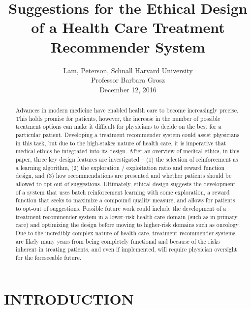 \documentclass[]{spie}  %
\title{Suggestions for the Ethical Design of a Health Care Treatment Recommender System}
\author{Lam, Peterson, Schnall
\skiplinehalf
Harvard University \\
Professor Barbara Grosz \\
December 12, 2016
}
\begin{document}
  \maketitle

\begin{abstract}

Advances in modern medicine have enabled health care to become increasingly precise. This holds promise for patients, however, the increase in the number of possible treatment options can make it difficult for physicians to decide on the best for a particular patient. Developing a treatment recommender system could assist physicians in this task, but due to the high-stakes nature of health care, it is imperative that medical ethics be integrated into its design. After an overview of medical ethics, in this paper, three key design features are investigated -- (1) the selection of reinforcement as a learning algorithm, (2) the exploration / exploitation ratio and reward function design, and (3) how recommendations are presented and whether patients should be allowed to opt out of suggestions. Ultimately, ethical design suggests the development of a system that uses batch reinforcement learning with some exploration, a reward function that seeks to maximize a compound quality measure, and allows for patients to opt-out of suggestions. Possible future work could include the development of a treatment recommender system in a lower-risk health care domain (such as in primary care) and optimizing the design before moving to higher-risk domains such as oncology. Due to the incredibly complex nature of health care, treatment recommender systems are likely many years from being completely functional and because of the risks inherent in treating patients, and even if implemented, will require physician oversight for the foreseeable future.
\end{abstract}



\section{INTRODUCTION}
\label{sec:intro}  %
\end{document}
